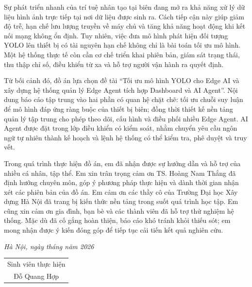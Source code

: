 \hypersetup{pageanchor=true}

Sự phát triển nhanh của trí tuệ nhân tạo tại biên đang mở ra khả năng xử lý
dữ liệu hình ảnh trực tiếp tại nơi dữ liệu được sinh ra. Cách tiếp cận này giúp giảm
độ trễ, hạn chế lưu lượng truyền về máy chủ và tăng khả năng hoạt động khi kết nối
mạng không ổn định. Tuy nhiên, việc đưa mô hình phát hiện đối tượng YOLO lên
thiết bị có tài nguyên hạn chế không chỉ là bài toán tối ưu mô hình. Một hệ thống
thực tế còn cần cơ chế triển khai phiên bản, giám sát trạng thái, thu thập chỉ số,
điều khiển từ xa và hỗ trợ người vận hành ra quyết định.

Từ bối cảnh đó, đồ án lựa chọn đề tài ``Tối ưu mô hình YOLO cho Edge AI
và xây dựng hệ thống quản lý Edge Agent tích hợp Dashboard và AI Agent''. Nội
dung báo cáo tập trung vào hai phần có quan hệ chặt chẽ: tối ưu chuỗi suy luận để
mô hình đáp ứng ràng buộc của thiết bị biên; đồng thời thiết kế nền tảng quản lý tập
trung cho phép theo dõi, cấu hình và điều phối nhiều Edge Agent. AI Agent được
đặt trong lớp điều khiển có kiểm soát, nhằm chuyển yêu cầu ngôn ngữ tự nhiên
thành kế hoạch và lệnh hệ thống có thể kiểm tra, phê duyệt và truy vết.

Trong quá trình thực hiện đồ án, em đã nhận được sự hướng dẫn và hỗ trợ
của nhiều cá nhân, tập thể. Em xin trân trọng cảm ơn TS. Hoàng Nam Thắng đã
định hướng chuyên môn, góp ý phương pháp thực hiện và dành thời gian nhận xét
các phiên bản của đồ án. Em cảm ơn các thầy cô của Trường Đại học Xây dựng Hà
Nội đã trang bị kiến thức nền tảng trong suốt quá trình học tập. Em cũng xin cảm
ơn gia đình, bạn bè và các thành viên đã hỗ trợ thử nghiệm hệ thống. Mặc dù đã
cố gắng hoàn thiện, báo cáo khó tránh khỏi thiếu sót; em mong nhận được ý kiến
đóng góp để tiếp tục cải tiến kết quả nghiên cứu.

\begin{flushright}
\textit{Hà Nội, ngày  tháng  năm 2026}\\
\begin{tabular}{c}
Sinh viên thực hiện\\[1.8cm]
Đỗ Quang Hợp
\end{tabular}
\end{flushright}
